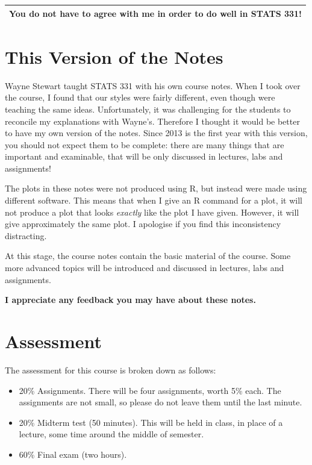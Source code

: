\begin{center}
\begin{tabular}{|c|}
\hline
{\bf You do not have to agree with me in order to do well in STATS 331!}\\
\hline
\end{tabular}
\end{center}

\section{This Version of the Notes}
Wayne Stewart taught STATS 331 with his own course notes. When I took over the
course, I found that our styles were fairly different, even though were teaching
the same ideas. Unfortunately, it was challenging for the students to reconcile
my explanations with Wayne's. Therefore I thought it would be better to have
my own version of the notes. Since 2013 is the first year with this version, you
should not expect them to be complete: there are many things that are important
and examinable, that will be only discussed in lectures, labs and assignments!

The plots in these notes were not produced using R, but instead were made using
different software. This means that when I give an R command for a plot,
it will not produce a plot that looks {\it exactly} like the plot I have given.
However, it will give approximately the same plot. I apologise if you find this
inconsistency distracting.

At this stage, the course notes contain the basic material of the course. Some
more advanced topics will be introduced and discussed in lectures, labs and
assignments.

\begin{framed}
\begin{center}
{\bf 
I appreciate any feedback you may have about these notes.
}
\end{center}
\end{framed}

\section{Assessment}
The assessment for this course is broken down as follows:
\begin{itemize}
\item 20\% Assignments. There will be four assignments, worth 5\% each. The
assignments are not small, so please do not leave them until the last minute.
\item 20\% Midterm test (50 minutes). This will be held in class, in place of
a lecture, some time around the middle of semester.
\item 60\% Final exam (two hours).
\end{itemize}

